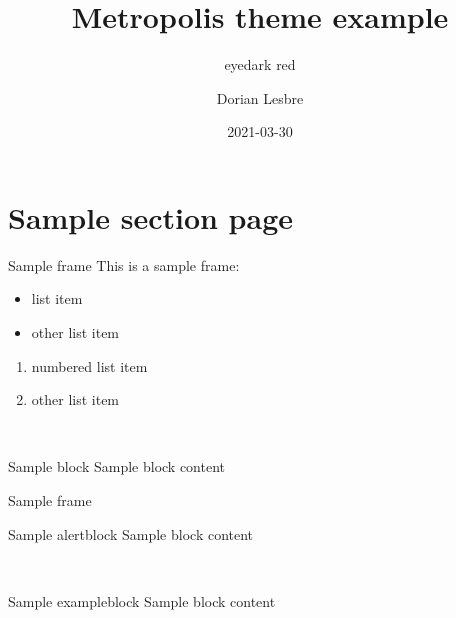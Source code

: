 \documentclass[14pt]{beamer}
\title{Metropolis theme example}
\subtitle{eyedark red}
\author{Dorian Lesbre}
\date{2021-03-30}
\begin{document}
\begin{frame}
	\titlepage
\end{frame}

\section{Sample section page}

\begin{frame}{Sample frame}
	This is a sample frame:
	\begin{multicols}{2}
		\begin{itemize}
			\item list item
			\item other list item
		\end{itemize}
		\begin{enumerate}
			\item numbered list item
			\item other list item
		\end{enumerate}
	\end{multicols}
	~\\
	\begin{block}{Sample block}
		Sample block content
	\end{block}
\end{frame}

\begin{frame}{Sample frame}

	\begin{alertblock}{Sample alertblock}
		Sample block content
	\end{alertblock}
	~\\
	\begin{exampleblock}{Sample exampleblock}
		Sample block content
	\end{exampleblock}
\end{frame}
\end{document}
